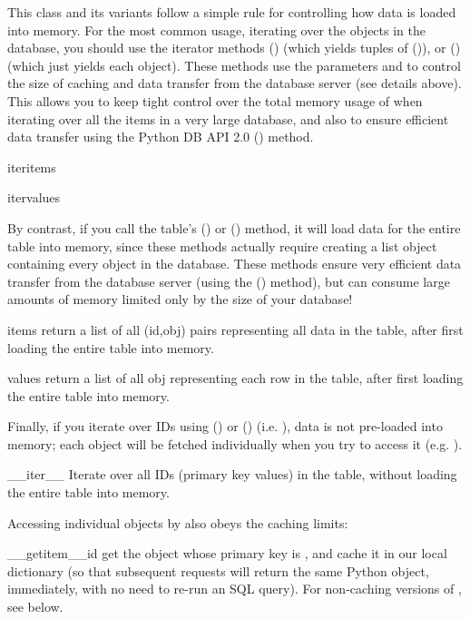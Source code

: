 \documentclass{howto}
\begin{document}
This class and its variants follow a simple rule for controlling
how data is loaded into memory.  For the most common usage,
iterating over the objects in the database, you should use the
iterator methods () (which yields tuples of ()),
or () (which just yields each object).  These methods
use the parameters  and  to control the
size of caching and data transfer from the database server (see details above).
This allows you to keep tight control over the total memory usage of 
when iterating over all the items in a very large database, and also to ensure
efficient data transfer using the Python DB API 2.0 () method.
\begin{funcdesc}{iteritems}{}
\end{funcdesc}
\begin{funcdesc}{itervalues}{}
\end{funcdesc}

By contrast, if you call the table's
() or () method, it will load data for the entire table into
memory, since these methods actually require creating a list object
containing every object in the database.
These methods ensure very efficient data transfer from the database server
(using the () method), but can consume large amounts of
memory limited only by the size of your database!
\begin{funcdesc}{items}{}
  return a list of all (id,obj) pairs representing all data in the table,
  after first loading the entire table into memory.
\end{funcdesc}
\begin{funcdesc}{values}{}
  return a list of all obj representing each row in the table,
  after first loading the entire table into memory.
\end{funcdesc}

Finally, if you iterate over IDs using () or ()
(i.e. ), data is not pre-loaded into memory;
each object will be fetched individually when you try to access it
(e.g. ).  

\begin{funcdesc}{__iter__}{}
  Iterate over all IDs (primary key values) in the table,
  without loading the entire table into memory.
\end{funcdesc}

Accessing individual objects by  also obeys the 
caching limits:
\begin{funcdesc}{__getitem__}{id}
  get the object whose primary key is , and cache it in
  our local dictionary (so that subsequent requests will return the
  same Python object, immediately, with no need to re-run an SQL query).
  For non-caching versions of , see below.
\end{funcdesc}
\end{document}
